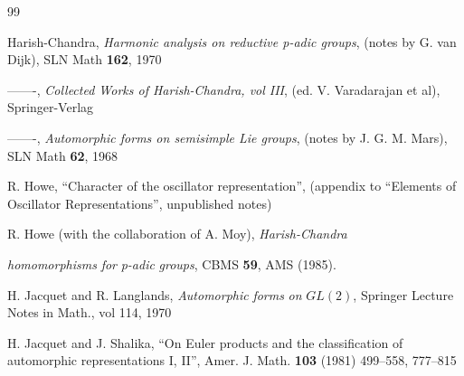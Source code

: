 \documentclass[12pt,letterpaper,openany]{book}
\theoremstyle{plain}
\theoremstyle{definition}
\theoremstyle{remark}
\theoremstyle{remark}
\begin{document}
\begin{thebibliography}{99}



 Harish-Chandra, \emph{Harmonic analysis on
reductive p-adic
groups}, (notes by G. van Dijk), SLN Math \textbf{162}, 1970

 -------, \emph{Collected Works of
Harish-Chandra, vol III}, (ed. V. Varadarajan et al), Springer-Verlag

 -------, \emph{Automorphic forms on semisimple
Lie groups}, (notes by J. G. M. Mars), SLN Math \textbf{62}, 1968




 R. Howe, ``Character of the oscillator representation'',
(appendix to ``Elements of Oscillator Representations'',
unpublished notes)

 R. Howe (with the collaboration of A. Moy),
\emph{Harish-Chandra}
 
\emph{homomorphisms} \emph{for}
\emph{p-adic} \emph{groups}, CBMS \textbf{59}, AMS (1985).


 H. Jacquet and R. Langlands,
\emph{Automorphic} \emph{forms}
\emph{on} \emph{$GL(2)$}, Springer Lecture Notes in Math.,
vol 114, 1970

 H. Jacquet and J. Shalika, ``On Euler products and the
classification of automorphic representations I, II'', Amer. J. Math.
\textbf{103} (1981) 499--558, 777--815


\end{thebibliography}
\end{document}
